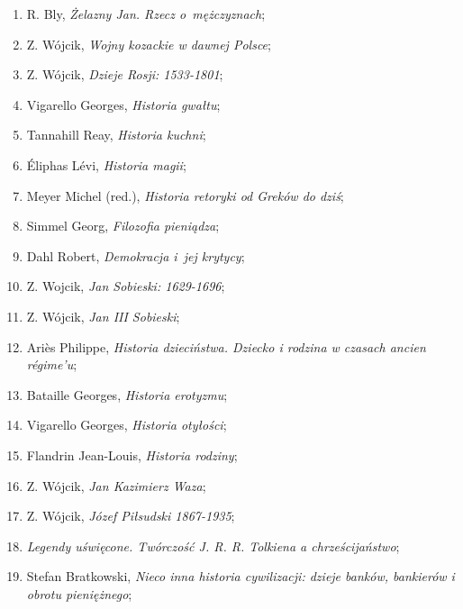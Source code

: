 \documentclass[a4paper,11pt]{article}
\begin{document}
\begin{enumerate}
\item R. Bly, \textit{Żelazny Jan. Rzecz o~mężczyznach};

\item Z. Wójcik, \textit{Wojny kozackie w dawnej Polsce};

\item Z. Wójcik, \textit{Dzieje Rosji: 1533-1801};

\item Vigarello Georges, \textit{Historia gwałtu};

\item Tannahill Reay, \textit{Historia kuchni};

\item Éliphas Lévi, \textit{Historia magii};

\item Meyer Michel (red.), \textit{Historia retoryki od Greków do dziś};

\item Simmel Georg, \textit{Filozofia pieniądza};

\item Dahl Robert, \textit{Demokracja i~jej krytycy};

\item Z. Wojcik, \textit{Jan Sobieski: 1629-1696};

\item Z. Wójcik, \textit{Jan III Sobieski};

\item Ariès Philippe, \textit{Historia dzieciństwa. Dziecko i rodzina w
    czasach ancien régime’u};

\item Bataille Georges, \textit{Historia erotyzmu};

\item Vigarello Georges, \textit{Historia otyłości};

\item Flandrin Jean-Louis, \textit{Historia rodziny};

\item Z. Wójcik, \textit{Jan Kazimierz Waza};

\item Z. Wójcik, \textit{Józef Piłsudski 1867-1935};

\item \textit{Legendy uświęcone. Twórczość J. R. R. Tolkiena a
    chrześcijaństwo};

\item Stefan Bratkowski, \textit{Nieco inna historia cywilizacji: dzieje
    banków, bankierów i obrotu pieniężnego};


\end{enumerate}
\end{document}
